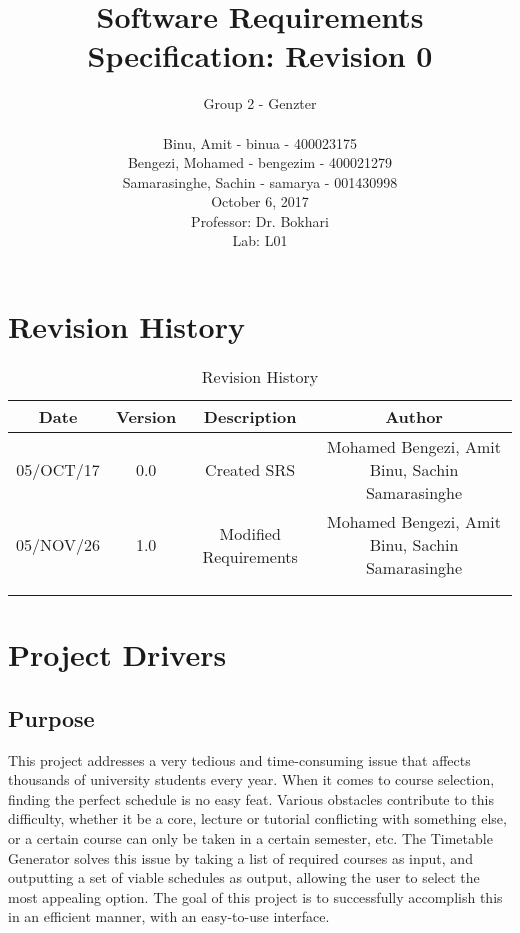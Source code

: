 \documentclass[12pt]{article}
\title{Software Requirements Specification: Revision 0}
\author{Group 2 - Genzter \\
		\\ Binu, Amit - binua - 400023175
		\\ Bengezi, Mohamed - bengezim - 400021279
		\\ Samarasinghe, Sachin - samarya - 001430998
		\\ October 6, 2017
		\\Professor: Dr. Bokhari
		\\ Lab: L01}
\begin{document}
\maketitle

\newpage

{\centering
  \tableofcontents\par
}

\newpage
\section{Revision History}
\begin{table}[h]
\begin{center}
\begin{tabular}{ | c | c | c | c | }
\hline
 Date & Version & Description & Author \\ 
\hline
 05/OCT/17 & 0.0 & Created SRS & Mohamed Bengezi, Amit Binu, Sachin Samarasinghe \\  
\hline
  05/NOV/26 & 1.0 & Modified Requirements & Mohamed Bengezi, Amit Binu, Sachin Samarasinghe \\
\hline
 & & & \\
\hline 
 & & & \\ 
\hline 
\end{tabular}
\end{center}
\caption{Revision History}
\end{table}

\newpage
\section{Project Drivers}
\subsection{Purpose}
\tab This project addresses a very tedious and time-consuming issue that affects thousands of university students every year. When it comes to course selection, finding the perfect schedule is no easy feat. Various obstacles contribute to this difficulty, whether it be a core, lecture or tutorial conflicting with something else, or a certain course can only be taken in a certain semester, etc. The Timetable Generator solves this issue by taking a list of required courses as input, and outputting a set of viable schedules as output, allowing the user to select the most appealing option. The goal of this project is to successfully accomplish this in an efficient manner, with an easy-to-use interface.
\end{document}
